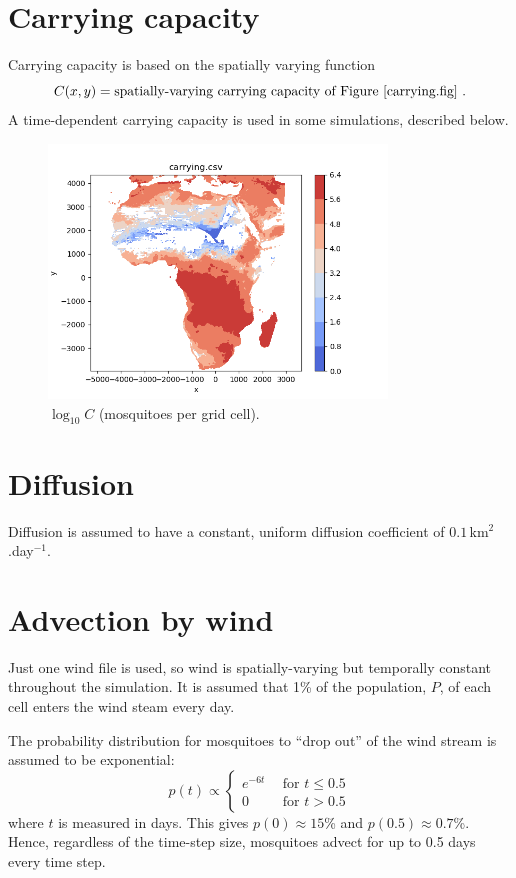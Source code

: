 \documentclass{article}
\begin{document}
\section{Carrying capacity}

Carrying capacity is based on the spatially varying function
\begin{equation}
  C(x,y) = \mbox{spatially-varying carrying capacity of Figure~\ref{carrying.fig}} \ .
\end{equation}
A time-dependent carrying capacity is used in some simulations, described below.

\begin{figure}[htb]
  \centering
  \includegraphics[width=9cm]{carrying.png}
  \caption{\label{carrying.fig}$\log_{10}C$ (mosquitoes per grid cell).}
\end{figure}

\section{Diffusion}

Diffusion is assumed to have a constant, uniform diffusion coefficient of $0.1$\,km$^{2}$.day$^{-1}$.

\section{Advection by wind}

Just one wind file is used, so wind is spatially-varying but temporally constant throughout the simulation.  It is assumed that 1\% of the population, $P$, of each cell enters the wind steam every day.

The probability distribution for mosquitoes to ``drop out'' of the wind stream is assumed to be exponential:
\begin{equation}
  p(t) \propto \left\{
  \begin{array}{ll}
    e^{-6t} & \ \ \mbox{for } t \leq 0.5 \\
    0 & \ \ \mbox{for } t > 0.5
  \end{array}
  \right.
\end{equation}
where $t$ is measured in days.  This gives $p(0)\approx 15$\% and $p(0.5) \approx 0.7$\%.  Hence, regardless of the time-step size, mosquitoes advect for up to 0.5 days every time step.
\end{document}
